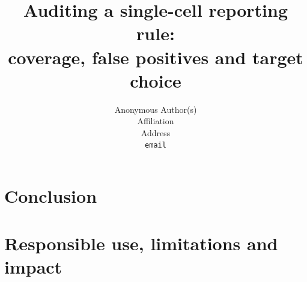 \documentclass{article}
\title{Auditing a single-cell reporting rule:\\
coverage, false positives and target choice}
\author{%
  Anonymous Author(s) \\
  Affiliation \\
  Address \\
  \texttt{email} \\
}
\begin{document}
\maketitle











\section{Conclusion}
\label{sec:conclusion}



\section{Responsible use, limitations and impact}
\label{sec:responsible}



\clearpage



\clearpage


\end{document}
